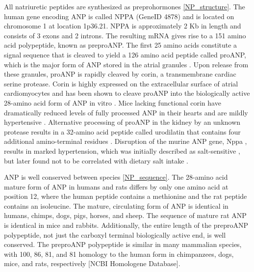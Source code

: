 \documentclass[14pt,a4paper,onecolumn]{article}
\begin{document}
All natriuretic peptides are synthesized as preprohormones \ref{NP_structure}.
The human gene encoding ANP is called NPPA (GeneID 4878) and is located on chromosome 1 at location 1p36.21. NPPA is approximately 2 Kb in length and consists of 3 exons and 2 introns. The resulting mRNA gives rise to a 151 amino acid polypeptide, known as preproANP. The first 25 amino acids constitute a signal sequence that is cleaved to yield a 126 amino acid peptide called proANP, which is the major form of ANP stored in the atrial granules \citep{Oikawa1984}.
Upon release from these granules, proANP is rapidly cleaved by corin, a transmembrane cardiac serine protease. Corin is highly expressed on the extracellular surface of atrial cardiomyocytes and has been shown to cleave proANP into the biologically active 28-amino acid form of ANP in vitro \citep{Yan2000}.
Mice lacking functional corin have dramatically reduced levels of fully processed ANP in their hearts and are mildly hypertensive \citep{Chan2005}.
Alternative processing of proANP in the kidney by an unknown protease results in a 32-amino acid peptide called urodilatin that contains four additional amino-terminal residues \citep{Forssmann1998}.
Disruption of the murine ANP gene, Nppa , results in marked hypertension, which was initially described as salt-sensitive \citep{John1995}, but later found not to be correlated with dietary salt intake \citep{John1996}.

ANP is well conserved between species \ref{NP_sequence}. The 28-amino acid mature form of ANP in humans and rats differs by only one amino acid at position 12, where the human peptide contains a methionine and the rat peptide contains an isoleucine. The mature, circulating form of ANP is identical in humans, chimps, dogs, pigs, horses, and sheep. The sequence of mature rat ANP is identical in mice and rabbits. Additionally, the entire length of the preproANP polypeptide, not just the carboxyl terminal biologically active end, is well conserved. The preproANP polypeptide is similar in many mammalian species, with 100, 86, 81, and 81 homology to the human form in chimpanzees, dogs, mice, and rats, respectively [NCBI Homologene Database].
\end{document}
